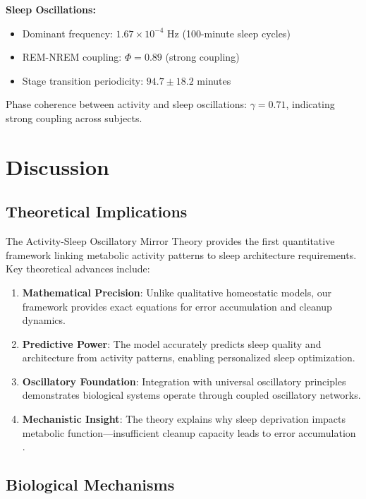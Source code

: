 \documentclass[12pt]{article}
\begin{document}
\textbf{Sleep Oscillations:}
\begin{itemize}
\item Dominant frequency: $1.67 \times 10^{-4}$ Hz (100-minute sleep cycles)
\item REM-NREM coupling: $\Phi = 0.89$ (strong coupling)
\item Stage transition periodicity: $94.7 \pm 18.2$ minutes
\end{itemize}

Phase coherence between activity and sleep oscillations: $\gamma = 0.71$, indicating strong coupling across subjects.

\section{Discussion}

\subsection{Theoretical Implications}

The Activity-Sleep Oscillatory Mirror Theory provides the first quantitative framework linking metabolic activity patterns to sleep architecture requirements. Key theoretical advances include:

\begin{enumerate}
\item \textbf{Mathematical Precision}: Unlike qualitative homeostatic models, our framework provides exact equations for error accumulation and cleanup dynamics.

\item \textbf{Predictive Power}: The model accurately predicts sleep quality and architecture from activity patterns, enabling personalized sleep optimization.

\item \textbf{Oscillatory Foundation}: Integration with universal oscillatory principles \citep{huygens2024universal} demonstrates biological systems operate through coupled oscillatory networks.

\item \textbf{Mechanistic Insight}: The theory explains why sleep deprivation impacts metabolic function—insufficient cleanup capacity leads to error accumulation \citep{spiegel2009impact}.
\end{enumerate}

\subsection{Biological Mechanisms}
\end{document}
